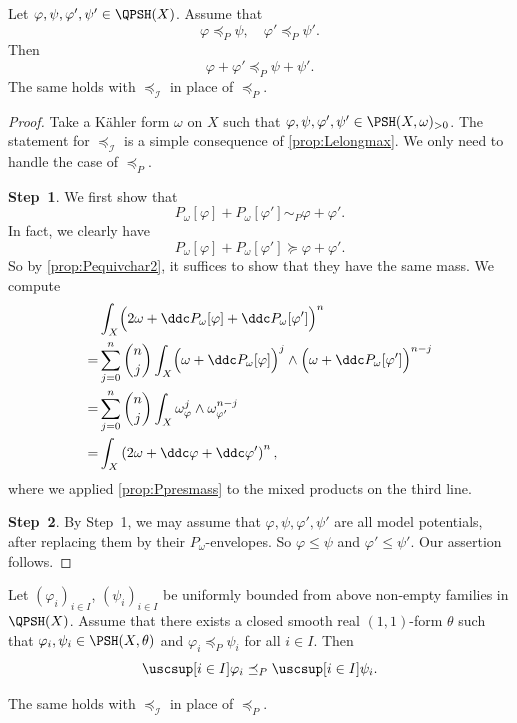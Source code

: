 \begin{proposition}\label{prop:Ppartialsum}
    Let $\varphi,\psi,\varphi',\psi'\in \QPSH(X)$. Assume that
    \[
    \varphi\preceq_P \psi,\quad \varphi'\preceq_P \psi'.
    \]
    Then
    \[
    \varphi+\varphi'\preceq_P \psi+\psi'.
    \]
    The same holds with $\preceq_{\mathcal{I}}$ in place of $\preceq_P$.
\end{proposition}
\begin{proof}
    Take a Kähler form $\omega$ on $X$ such that $\varphi,\psi,\varphi',\psi'\in \PSH(X,\omega)_{>0}$. The statement for $\preceq_{\mathcal{I}}$ is a simple consequence of \cref{prop:Lelongmax}. We only need to handle the case of $\preceq_{P}$.

    \textbf{Step~1}.
    We first show that
    \[
    P_{\omega}[\varphi]+P_{\omega}[\varphi']\sim_P \varphi+\varphi'.
    \]
    In fact, we clearly have
    \[
    P_{\omega}[\varphi]+P_{\omega}[\varphi']\succeq \varphi+\varphi'.
    \]
    So by \cref{prop:Pequivchar2}, it suffices to show that they have the same mass. We compute
    \[
    \begin{aligned}
    &\int_X \Bigl(2\omega+\ddc P_{\omega}[\varphi]+\ddc P_{\omega}[\varphi']\Bigr)^n\\
    =& \sum_{j=0}^n \binom{n}{j} \int_X \Bigl(\omega+\ddc P_{\omega}[\varphi]\Bigr)^j\wedge \Bigl(\omega+\ddc P_{\omega}[\varphi']\Bigr)^{n-j}\\
    =& \sum_{j=0}^n \binom{n}{j} \int_X \omega_{\varphi}^j\wedge \omega_{\varphi'}^{n-j}\\
    =& \int_X \left(2\omega+\ddc\varphi+\ddc\varphi'\right)^n,
    \end{aligned}
    \]
    where we applied \cref{prop:Ppresmass} to the mixed products on the third line.

    \textbf{Step~2}. By Step~1, we may assume that $\varphi,\psi,\varphi',\psi'$ are all model potentials, after replacing them by their $P_{\omega}$-envelopes. So $\varphi\leq \psi$ and $\varphi'\leq \psi'$. Our assertion follows.
\end{proof}
\begin{proposition}\label{prop:Ppartialsup}
    Let $(\varphi_i)_{i\in I}$, $(\psi_i)_{i\in I}$ be uniformly bounded from above non-empty families in $\QPSH(X)$. Assume that there exists a closed smooth real $(1,1)$-form $\theta$ such that $\varphi_i,\psi_i\in \PSH(X,\theta)$ and $\varphi_i\preceq_P \psi_i$ for all $i\in I$. Then
    \[
    \uscsup[i\in I] \varphi_i\preceq_P \uscsup[i\in I]\psi_i.
    \]

    The same holds with $\preceq_{\mathcal{I}}$ in place of $\preceq_P$.
\end{proposition}
